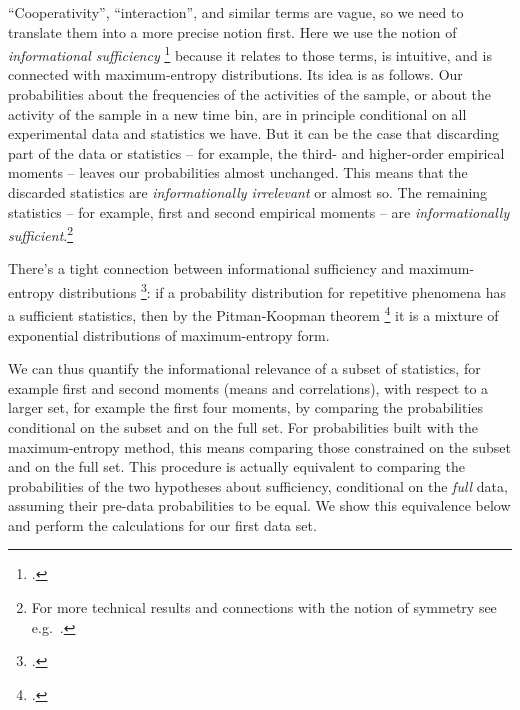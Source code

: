 \documentclass[\ifafour a4paper,12pt,\else a5paper,10pt,\fi%
onecolumn,oneside,article,%
british%
]{memoir}
\theoremstyle{remark}
\theoremstyle{innote}
\newcommand*{\citep}{\footcites}
\newcommand*{\amp}{\&}
\renewcommand*{\|}{\nonscript\,\vert\nonscript\;\mathopen{}}
\newcommand*{\sect}{\S}%
\newcommand*{\chap}{ch.}%
\newcommand*{\eg}{{e.g.}}
\begin{document}
\bigskip

\enquote{Cooperativity}, \enquote{interaction}, and similar terms are
vague, so we need to translate them into a more precise notion first. Here
we use the notion of \emph{informational sufficiency}
\citep[\sect~4.5]{bernardoetal1994}[\chap~8 \amp\
\sect~14.2]{jaynes1994_r2003}{cifarellietal1982,kullbacketal1951}[the
notion goes back to][]{fisher1922} because it relates to those terms, is
intuitive, and is connected with maximum-entropy distributions. Its idea is
as follows. Our probabilities about the frequencies of the activities of
the sample, or about the activity of the sample in a new time bin, are in
principle conditional on all experimental data and statistics we have. But
it can be the case that discarding part of the data or statistics -- for
example, the third- and higher-order empirical moments -- leaves our
probabilities almost unchanged. This means that the discarded statistics
are \emph{informationally irrelevant} or almost so. The remaining
statistics -- for example, first and second empirical moments -- are
\emph{informationally sufficient}.\footnote{For more technical results and
  connections with the notion of symmetry see \eg\
  \cite{darmois1935,neyman1935,koopman1936,pitman1936,halmosetal1949,bahadur1954,berk1972,lauritzen1974,lauritzen1982_r1988,lauritzen2007,cifarellietal1980,cifarellietal1981,diaconisetal1981,diaconis1992,furmanczyketal1998,fortinietal2000,nogalesetal2000,kallenberg2005,ayetal2015}.}

There's a tight connection between informational sufficiency and
maximum-entropy distributions
\citep{jaynes1982b}[\sect~4.5.4]{bernardoetal1994}: if a probability
distribution for repetitive phenomena has a sufficient statistics, then by
the Pitman-Koopman theorem \citep{koopman1936,pitman1936,darmois1935}[for
later analyses and the discrete case
see][]{hipp1974,andersen1970,denny1967,denny1972,fraser1963,barankinetal1963,barndorffnielsen1978_r2014}
it is a mixture of exponential distributions of maximum-entropy form.



We can thus quantify the informational relevance of a subset of statistics,
for example first and second moments (means and correlations), with respect
to a larger set, for example the first four moments, by comparing the
probabilities conditional on the subset and on the full set. For
probabilities built with the maximum-entropy method, this means comparing
those constrained on the subset and on the full set. This procedure is
actually equivalent to comparing the probabilities of the two hypotheses
about sufficiency, conditional on the \emph{full} data, assuming their
pre-data probabilities to be equal. We show this equivalence below and
perform the calculations for our first data set.
\medskip
\end{document}
